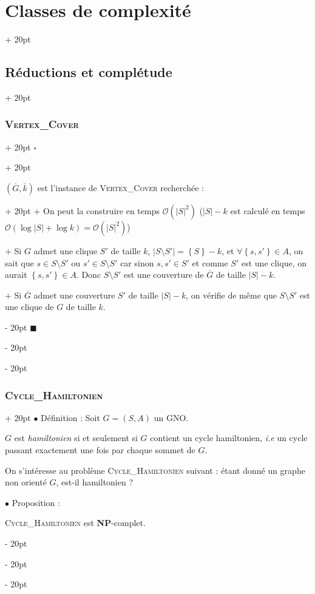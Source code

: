 \documentclass[a4paper, 12pt, twoside]{article}
\newcommand{\cj}[1]{\overline{#1}} %
\newcommand{\lr}[1]{\left( #1 \right)}
\newcommand{\set}[1]{\left\{ #1 \right\}}
\newcommand{\abs}[1]{\left\lvert #1 \right\rvert}
\newcommand{\ind}[1][20pt]{\advance\leftskip + #1}
\newcommand{\deind}[1][20pt]{\advance\leftskip - #1}
\newenvironment{indt}[2][20pt]{#2 \par \ind[#1]}{\par \deind} %
\newenvironment{proof}[1][{}]{\begin{indt}{$\square$ #1}}{$\blacksquare$ \end{indt}}
\begin{document}
\begin{indt}{\section{Classes de complexité}}
\begin{indt}{\subsection{Réductions et complétude}}
\begin{indt}{\subsubsection{\textsc{Vertex\_Cover}}}
\begin{proof}
                    \vspace{6pt}
                    
                    \begin{indt}{$(\cj G, \cj k)$ est l'instance de \textsc{Vertex\_Cover} recherchée :}
                        $+$ On peut la construire en temps $\mathcal O\!\lr{\abs S ^2}$ ($\abs S - k$ est calculé en temps $\mathcal O(\log \abs S + \log k) = \mathcal O\!\lr{\abs S ^2}$)
                        
                        $+$ Si $G$ admet une clique $S'$ de taille $k$, $\abs{S \setminus S'} = \set S - k$, et $\forall \set{s, s'} \in A$, on sait que $s \in S \setminus S'$ ou $s' \in S \setminus S'$ car sinon $s, s' \in S'$ et comme $S'$ est une clique, on aurait $\set{s, s'} \in A$.
                        Donc $S \setminus S'$ est une couverture de $\cj G$ de taille $\abs S - k$.
                        
                        $+$ Si $\cj G$ admet une couverture $S'$ de taille $\abs S - k$, on vérifie de même que $S \setminus S'$ est une clique de $G$ de taille $k$.
                    \end{indt}
                \end{proof}
            \end{indt}

            \vspace{12pt}
            
            \begin{indt}{\subsubsection{\textsc{Cycle\_Hamiltonien}}}
                $\bullet$ Définition : Soit $G = (S, A)$ un GNO.

                $G$ est \emph{hamiltonien} si et seulement si $G$ contient un cycle hamiltonien, \textit{i.e} un cycle passant exactement une fois par chaque sommet de $G$.

                \vspace{6pt}
                
                On s'intéresse au problème \textsc{Cycle\_Hamiltonien} suivant : étant donné un graphe non orienté $G$, est-il hamiltonien ?

                \vspace{12pt}
                
                $\bullet$ Proposition :
                \begin{emphBox}
                    \textsc{Cycle\_Hamiltonien} est \textbf{NP}-complet.
                \end{emphBox}


\end{indt}
\end{indt}
\end{indt}
\end{document}
